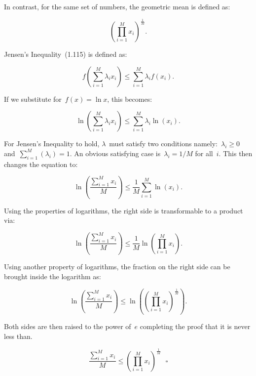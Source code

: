 \documentclass{report}
\begin{document}
  In contrast, for the same set of numbers, the geometric mean is defined as:
  
  \[ \left( \prod_{i=1}^{M}x_i \right)^\frac{1}{M}\textrm{.} \]
  
  Jensen's Inequality~(1.115) is defined as:
  
  \begin{equation}
    f \left( \sum_{i=1}^M{\lambda_{i} x_i} \right) \leq \sum_{i=1}^M{\lambda_{i} f(x_i)}\textrm{.}
    \label{e40:q9eq115}
  \end{equation}
  
  If we substitute for~$f(x)=\ln x$, this becomes:

  \[ \ln \left( \sum_{i=1}^M{\lambda_{i} x_i} \right) \leq \sum_{i=1}^M{\lambda_{i} \ln(x_i)}\textrm{.} \]
  
  For Jensen's Inequality to hold, $\lambda$~must satisfy two conditions namely:~$\lambda_i \geq 0$ and~$\sum_{i=1}^{M}\left( \lambda_i \right) = 1$.  An obvious satisfying case is~$\lambda_i=1/M$ for all~$i$.  This then changes the equation to:
  
  \[ \ln \left( \frac{\sum_{i=1}^{M}{x_i}}{M} \right) \leq \frac{1}{M}\sum_{i=1}^M{\ln(x_i)}\textrm{.} \]
  
  Using the properties of logarithms, the right side is transformable to a product via:
  
  \[ \ln \left( \frac{\sum_{i=1}^{M}{x_i}}{M} \right) \leq \frac{1}{M}{\ln \left( \prod_{i=1}^M{x_i} \right)}\textrm{.} \]
  
  Using another property of logarithms, the fraction on the right side can be brought inside the logarithm as:
  
  \[ \ln \left( \frac{\sum_{i=1}^{M}{x_i}}{M} \right) \leq \ln \left( \left( \prod_{i=1}^M{x_i}\right)^\frac{1}{M} \right) \textrm{.} \]
  
  Both sides are then raised to the power of~$e$ completing the proof that it is never less than.
  
    \[ \frac{\sum_{i=1}^{M}{x_i}}{M} \leq \left( \prod_{i=1}^M{x_i}\right)^\frac{1}{M}  ~~~\square \]
\end{document}
